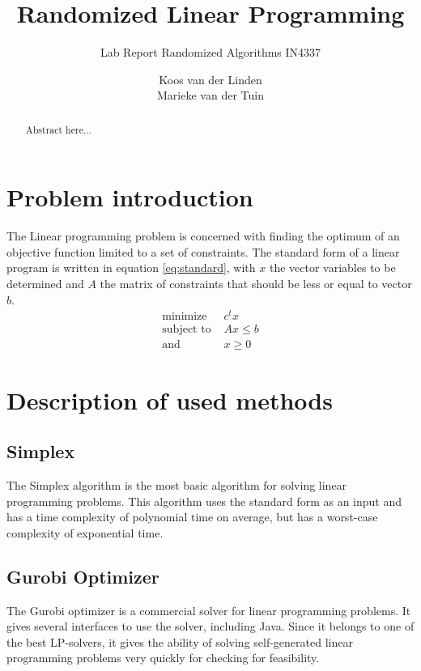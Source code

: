 \documentclass{acm_proc_article-sp}
\begin{document}
\title{Randomized Linear Programming}
\subtitle{Lab Report Randomized Algorithms IN4337}
\author{
\alignauthor
Koos van der Linden \\ 
\alignauthor
Marieke van der Tuin \\ 
}
\maketitle
\begin{abstract}
Abstract here...
\end{abstract}

\section{Problem introduction}
The Linear programming problem is concerned with finding the optimum of an objective function limited to a set of constraints. The standard form of a linear program is written in equation \ref{eq:standard}, with $x$ the vector variables to be determined and $A$ the matrix of constraints that should be less or equal to vector $b$.
\begin{equation}
\label{eq:standard}
\begin{split}
\text{minimize } & c^t x \\
\text{subject to } &  Ax\leq b \\
\text{and } & x \geq 0
\end{split}
\end{equation}

\section{Description of used methods}
\subsection{Simplex}
The Simplex algorithm \cite{dantzig1951maximization} is the most basic algorithm for solving linear programming problems. This algorithm uses the standard form as an input and has a time complexity of polynomial time on average, but has a worst-case complexity of exponential time. 

\subsection{Gurobi Optimizer}
The Gurobi optimizer is a commercial solver for linear programming problems. It gives several interfaces to use the solver, including Java. Since it belongs to one of the best LP-solvers, it gives the ability of solving self-generated linear programming problems very quickly for checking for feasibility.
\end{document}
